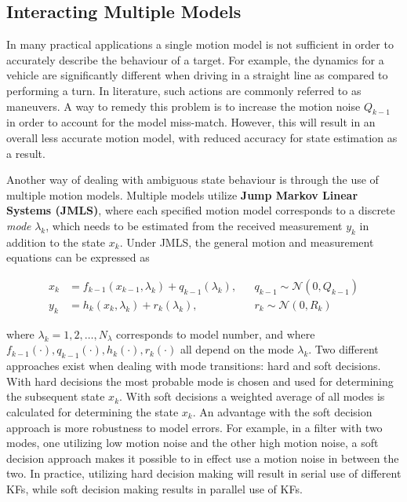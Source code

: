 \subsection{Interacting Multiple Models}
In many practical applications a single motion model is not sufficient in order to accurately describe the behaviour of a target. For example, the dynamics for a vehicle are significantly different when driving in a straight line as compared to performing a turn. In literature, such actions are commonly referred to as maneuvers. A way to remedy this problem is to increase the motion noise $Q_{k-1}$ in order to account for the model miss-match. However, this will result in an overall less accurate motion model, with reduced accuracy for state estimation as a result.

Another way of dealing with ambiguous state behaviour is through the use of multiple motion models. Multiple models utilize \textbf{Jump Markov Linear Systems (JMLS)}, where each specified motion model corresponds to a discrete \emph{mode} $\lambda_k$, which needs to be estimated from the received measurement $y_k$ in addition to the state $x_{k}$. Under JMLS, the general motion and measurement equations can be expressed as 


\begin{align}
    x_{k} &= f_{k-1}(x_{k-1},\lambda_k) + q_{k-1}(\lambda_k), & &q_{k-1} \sim \mathcal{N}(0,Q_{k-1})\\
    y_{k} &= h_k(x_{k}, \lambda_k) + r_k(\lambda_k), & &r_{k} \sim \mathcal{N}(0,R_{k})
\end{align}


where $\lambda_k = 1,2,\dots,N_{\lambda}$ corresponds to model number, and where $f_{k-1}(\cdot), q_{k-1}(\cdot), h_k(\cdot), r_k(\cdot)$ all depend on the mode $\lambda_k$. Two different approaches exist when dealing with mode transitions: hard and soft decisions. With hard decisions the most probable mode is chosen and used for determining the subsequent state $x_k$. With soft decisions a weighted average of all modes is calculated for determining the state $x_k$. An advantage with the soft decision approach is more robustness to model errors. For example, in a filter with two modes, one utilizing low motion noise and the other high motion noise, a soft decision approach makes it possible to in effect use a motion noise in between the two. In practice, utilizing hard decision making will result in serial use of different KFs, while soft decision making results in parallel use of KFs. 

